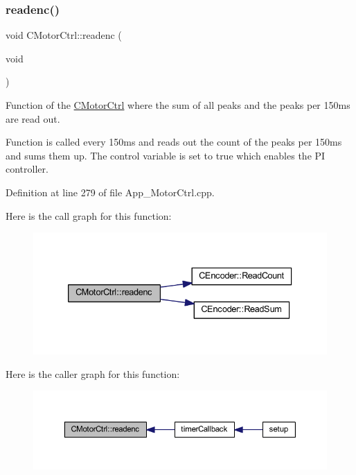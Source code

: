 \subsubsection{\texorpdfstring{readenc()}{readenc()}}
{\footnotesize\ttfamily void C\+Motor\+Ctrl\+::readenc (\begin{DoxyParamCaption}\item[{void}]{ }\end{DoxyParamCaption})}



Function of the \mbox{\hyperlink{class_c_motor_ctrl}{C\+Motor\+Ctrl}} where the sum of all peaks and the peaks per 150ms are read out. 

Function is called every 150ms and reads out the count of the peaks per 150ms and sums them up. The control variable is set to true which enables the PI controller. 

Definition at line 279 of file App\+\_\+\+Motor\+Ctrl.\+cpp.

Here is the call graph for this function\+:
\nopagebreak
\begin{figure}[H]
\begin{center}
\leavevmode
\includegraphics[width=333pt]{class_c_motor_ctrl_a8a76501cf8eaa85c5131bde5f33b6699_cgraph}
\end{center}
\end{figure}
Here is the caller graph for this function\+:
\nopagebreak
\begin{figure}[H]
\begin{center}
\leavevmode
\includegraphics[width=350pt]{class_c_motor_ctrl_a8a76501cf8eaa85c5131bde5f33b6699_icgraph}
\end{center}
\end{figure}
\mbox{\label{class_c_motor_ctrl_a63e5dd36be027fe8a5e1acee5c1322c8}} 
